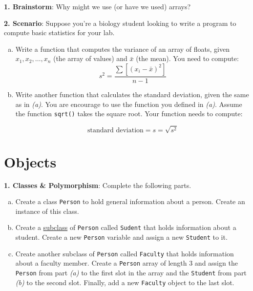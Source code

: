 \documentclass[11pt]{article}
\begin{document}
\textbf{1. Brainstorm}: Why might we use (or have we used) arrays?

\vspace{5em}

\noindent\textbf{2. Scenario}: Suppose you're a biology student looking to write a program to compute basic statistics for your lab.

\begin{enumerate}[(a)]
	\item Write a function that computes the variance of an array of floats, given \( x_1, x_2, \dots, x_n \) (the array of values) and \( \bar{x} \) (the mean). You need to compute:
	\[ s^2 = \frac{\sum[(x_i - \bar{x})^2]}{n-1} \]
	\vspace{25em}
	\item Write another function that calculates the standard deviation, given the same as in \textit{(a)}. You are encourage to use the function you defined in \textit{(a)}. Assume the function \texttt{sqrt()} takes the square root. Your function needs to compute:
	
	\[ \text{standard deviation} = s = \sqrt{s^2} \]
	\vspace{15em}
\end{enumerate}

\section{Objects}

\textbf{1. Classes \& Polymorphism}: Complete the following parts.

\begin{enumerate}[(a)]
	\item Create a class \texttt{Person} to hold general information about a person. Create an instance of this class.
	\vspace{25em}
	\pagebreak
	\item Create a \underline{subclass} of \texttt{Person} called \texttt{Sudent} that holds information about a student. Create a new \texttt{Person} variable and assign a new \texttt{Student} to it.
	\vspace{30em}
	\item Create another subclass of \texttt{Person} called \texttt{Faculty} that holds information about a faculty member. Create a \texttt{Person} array of length 3 and assign the \texttt{Person} from part \textit{(a)} to the first slot in the array and the \texttt{Student} from part \textit{(b)} to the second slot. Finally, add a new \texttt{Faculty} object to the last slot.
\end{enumerate}
\end{document}
